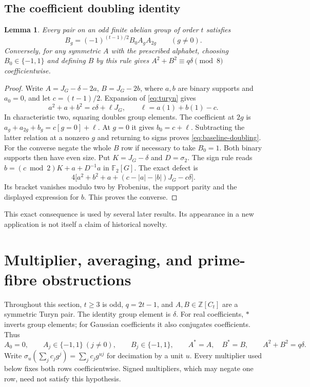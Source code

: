 \documentclass[11pt]{article}
\newtheorem{lemma}[theorem]{Lemma}
\theoremstyle{definition}
\theoremstyle{remark}
\begin{document}
\subsection{The coefficient doubling identity}
\begin{lemma}\label{lem:doubling}
Every pair on an odd finite abelian group of order $t$ satisfies
\begin{equation}\label{eq:baseline-doubling}
 B_g=(-1)^{(t-1)/2}B_0A_gA_{2g}\qquad(g\ne0).
\end{equation}
Conversely, for any symmetric $A$ with the prescribed alphabet, choosing
$B_0\in\{-1,1\}$ and defining $B$ by this rule gives
$A^2+B^2\equiv q\delta\pmod8$ coefficientwise.
\end{lemma}
\begin{proof}
Write $A=J_G-\delta-2a$, $B=J_G-2b$, where $a,b$ are binary supports and
$a_0=0$, and let $c=(t-1)/2$. Expansion of \eqref{eq:turyn} gives
\[
 a^2+a+b^2=c\delta+\ell J_G,\qquad \ell=a(1)+b(1)-c.
\]
In characteristic two, squaring doubles group elements. The coefficient
at $2g$ is $a_g+a_{2g}+b_g=c[g=0]+\ell$. At $g=0$ it gives
$b_0=c+\ell$. Subtracting the latter relation at a nonzero $g$ and
returning to signs proves \eqref{eq:baseline-doubling}.
For the converse negate the whole $B$ row if necessary to take $B_0=1$.
Both binary supports then have even size. Put $K=J_G-\delta$ and
$D=\sigma_2$. The sign rule reads
$b=(c\bmod2)K+a+D^{-1}a$ in $\mathbb F_2[G]$. The exact defect is
\[
 4\bigl[a^2+b^2+a+(c-|a|-|b|)J_G-c\delta\bigr].
\]
Its bracket vanishes modulo two by Frobenius, the support parity and the
displayed expression for $b$. This proves the converse.
\end{proof}
This exact consequence is used by several later results. Its appearance
in a new application is not itself a claim of historical novelty.

\section{Multiplier, averaging, and prime-fibre obstructions}
\label{early-section}

Throughout this section, $t\geq3$ is odd, $q=2t-1$, and $A,B\in
\mathbb Z[C_t]$ are a symmetric Turyn pair. The identity group element is
$\delta$. For real coefficients, $*$ inverts group elements; for Gaussian
coefficients it also conjugates coefficients. Thus
\[
 A_0=0,\qquad A_j\in\{-1,1\}\ (j\ne0),\qquad
 B_j\in\{-1,1\},\qquad A^*=A,\quad B^*=B,
 \qquad A^2+B^2=q\delta.
\]
Write $\sigma_u(\sum_j c_jg^j)=\sum_j c_jg^{uj}$ for decimation by a unit
$u$. Every multiplier used below fixes both rows coefficientwise. Signed
multipliers, which may negate one row, need not satisfy this hypothesis.
\end{document}
